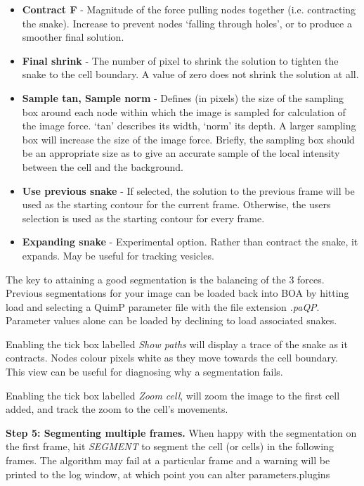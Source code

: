 \documentclass[a4paper,12pt]{article}
\begin{document}
\begin{itemize}
\item \textbf{Contract F} - Magnitude of the force pulling nodes together (i.e. contracting the snake).  Increase to prevent nodes `falling
through holes', or to produce a smoother final solution.
\item \textbf{Final shrink} - The number of pixel to shrink the solution to tighten the snake to the cell boundary.  A value of zero does
not shrink the solution at all.
\item \textbf{Sample tan, Sample norm} - Defines (in pixels) the size of the sampling box around each node within which the 
image is sampled for calculation of the image force.  `tan' describes its width, `norm' its depth.  A larger sampling box will increase 
the size of the image force.  Briefly, the sampling box should be an appropriate size as to give an accurate sample of the local
 intensity between the cell and the background.
\item \textbf{Use previous snake} - If selected, the solution to the previous frame will be used as the starting contour for the current frame.
Otherwise, the users selection is used as the starting contour for every frame.
\item \textbf{Expanding snake} - Experimental option. Rather than contract the snake, it expands.  May be useful for tracking vesicles.
\end{itemize}

The key to attaining a good segmentation is the balancing of the 3 forces. Previous segmentations for your image can be loaded
back into BOA by hitting load and selecting a QuimP parameter file with the file extension \textit{.paQP}.
Parameter values alone can be loaded by declining to load associated snakes.

Enabling the tick box labelled \textit{Show paths} will display a trace of the snake as it contracts.  Nodes colour pixels white as they
move towards the cell boundary.  This view can be useful for diagnosing why a segmentation fails.

Enabling the tick box labelled \textit{Zoom cell}, will zoom the image to the first cell added, and track the zoom to 
the cell's movements.


\textbf{Step 5: Segmenting multiple frames.}  When happy with the segmentation on the first frame, hit \textit{SEGMENT} to segment
the cell (or cells) in the following frames.  The algorithm may fail at a particular frame and a warning will be printed to the log window,
at which point you can alter parameters.plugins
\end{document}
